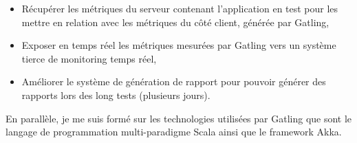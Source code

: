 \begin{itemize}
	\item Récupérer les métriques du serveur contenant l'application en test pour les mettre en relation avec les métriques du côté client, générée par Gatling,
	\item Exposer en temps réel les métriques mesurées par Gatling vers un système tierce de monitoring temps réel,
	\item Améliorer le système de génération de rapport pour pouvoir générer des rapports lors des long tests (plusieurs jours).\\
\end{itemize}

En parallèle, je me suis formé sur les technologies utilisées par Gatling que sont le langage de programmation multi-paradigme Scala ainsi que le framework Akka.